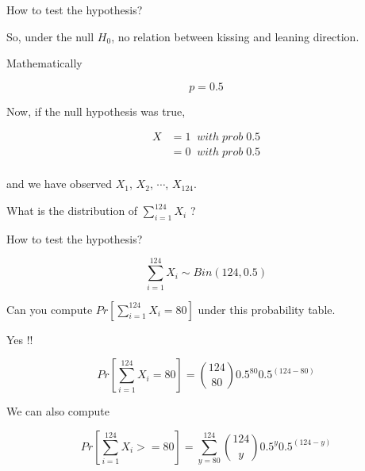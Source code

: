 \documentclass{beamer}\usepackage[]{graphicx}\usepackage[]{color}
\begin{document}
\begin{frame}{How to test the hypothesis?}

So, under the null $H_{0}$, no relation between kissing and leaning direction.

Mathematically \pause \newline

$$ p =0.5 $$

Now, if the null hypothesis was true,

\begin{align}
X & = 1 \;\; with \; prob  \; 0.5 \\
  & = 0 \; \; with \; prob \; 0.5 \\
\end{align} \pause

and we have observed $X_1$, $X_2$, $\cdots$, $X_{124}$. \pause \newline

What is the distribution of $\sum_{i=1}^{124} X_{i}$ ?

\end{frame}

\begin{frame}{How to test the hypothesis?}

$$ \sum_{i=1}^{124} X_{i} \sim Bin \left (124, 0.5 \right )  $$

Can you compute $Pr [ \sum_{i=1}^{124} X_{i} = 80 ]$ under this probability table. \pause
\newline

Yes !!  \pause \newline

$$ Pr \left [ \sum_{i=1}^{124} X_{i} = 80 \right ] = {124\choose 80} 0.5^{80} 0.5^{(124-80)}  $$

We can also compute 

$$ Pr \left [ \sum_{i=1}^{124} X_{i} >= 80 \right ] = \sum_{y=80}^{124} {124\choose y} 0.5^y 0.5^{(124-y)}  $$

\end{frame}
\end{document}
